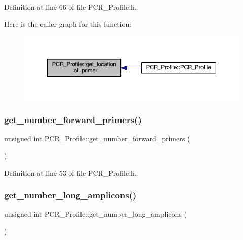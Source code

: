 Definition at line 66 of file P\+C\+R\+\_\+\+Profile.\+h.

Here is the caller graph for this function\+:
\nopagebreak
\begin{figure}[H]
\begin{center}
\leavevmode
\includegraphics[width=350pt]{class_p_c_r___profile_a7f9b958200413a71f4edd93277da1765_icgraph}
\end{center}
\end{figure}
\mbox{\label{class_p_c_r___profile_a5222753c5f4b1568f7254be8fbc7c862}} 
\subsubsection{\texorpdfstring{get\+\_\+number\+\_\+forward\+\_\+primers()}{get\_number\_forward\_primers()}}
{\footnotesize\ttfamily unsigned int P\+C\+R\+\_\+\+Profile\+::get\+\_\+number\+\_\+forward\+\_\+primers (\begin{DoxyParamCaption}{ }\end{DoxyParamCaption})\hspace{0.3cm}{\ttfamily [inline]}}



Definition at line 53 of file P\+C\+R\+\_\+\+Profile.\+h.

\mbox{\label{class_p_c_r___profile_a91a98d9005a63450de3f782c9374972a}} 
\subsubsection{\texorpdfstring{get\+\_\+number\+\_\+long\+\_\+amplicons()}{get\_number\_long\_amplicons()}}
{\footnotesize\ttfamily unsigned int P\+C\+R\+\_\+\+Profile\+::get\+\_\+number\+\_\+long\+\_\+amplicons (\begin{DoxyParamCaption}{ }\end{DoxyParamCaption})\hspace{0.3cm}{\ttfamily [inline]}}



